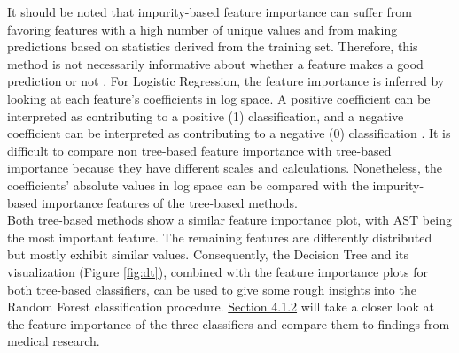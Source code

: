 It should be noted that impurity-based feature importance can suffer 
from favoring features with a high number of unique values and from making 
predictions based on statistics derived from the training set. Therefore, this 
method is not necessarily informative about whether a feature makes a 
good prediction or not \cite{RN178}.
For Logistic Regression, the feature importance is inferred by looking at 
each feature's coefficients in log space. A positive coefficient can be 
interpreted as contributing to a positive (1) classification, and a negative 
coefficient can be interpreted as contributing to a negative (0) classification 
\cite{RN174}.
It is difficult to compare non tree-based feature importance with tree-based 
importance because they have different scales and calculations. Nonetheless, 
the 
coefficients' absolute values in log space can be compared with the 
impurity-based importance features of the tree-based methods.
\\
Both tree-based methods show a similar feature importance plot, with AST being 
the most important feature. The remaining features are differently distributed 
but mostly exhibit similar values. Consequently, the Decision Tree and its 
visualization (Figure \ref{fig:dt}), combined with the feature 
importance plots for both tree-based classifiers, can be used to give some 
rough insights into the Random Forest classification procedure. 
\hyperref[sec:medical]{Section 4.1.2} will take a closer look at the feature 
importance of the three classifiers and compare them to findings from medical 
research.

